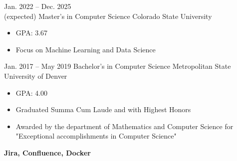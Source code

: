 \documentclass[8pt]{resumeclass}
\begin{document}
\begin{entrylist}
	\entry
		{Jan. 2022 -- Dec. 2025\\ (expected)}
		{Master's in Computer Science}
		{Colorado State University}
		{{\vspace{-4mm}\begin{itemize}[noitemsep,nolistsep]
			\small
			\item GPA: 3.67
			\item Focus on Machine Learning and Data Science
		\end{itemize}}}
	\entry
		{Jan. 2017 -- May 2019}
		{Bachelor's in Computer Science}
		{Metropolitan State University of Denver}
		{{\vspace{-4mm}\begin{itemize}[noitemsep,nolistsep]
			\small
			\item GPA: 4.00
			\item Graduated Summa Cum Laude and with Highest Honors
			\item Awarded by the department of Mathematics and Computer Science for "Exceptional accomplishments in Computer Science"
		\end{itemize}}}
\end{entrylist}


\vspace{6pt}
\begin{minipage}[t]{0.5\textwidth}
	\vspace{-\baselineskip}

\end{minipage}
\hfill
\begin{minipage}[t]{0.5\textwidth}
	\vspace{-\baselineskip}

	\textbf{Jira, Confluence, Docker}\\
\end{minipage}
\end{document}
